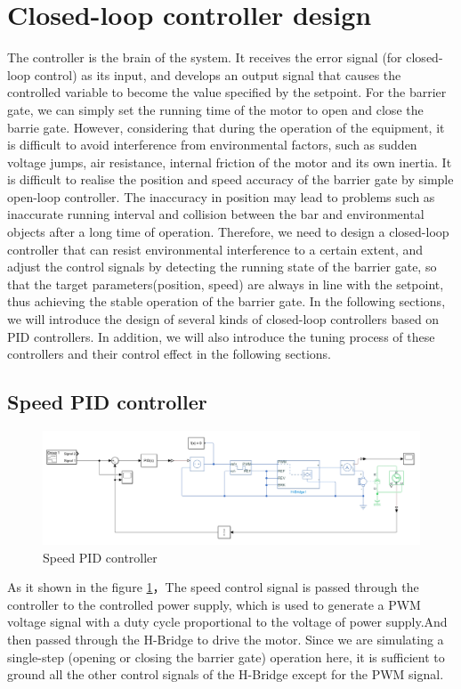 \documentclass[11pt,a4paper]{article}%
\begin{document}
\section{Closed-loop controller design}
The controller is the brain of the system. It receives the error signal (for closed-loop control) as its input, and develops an output signal that causes the controlled variable to become the value specified by the setpoint. For the barrier gate, we can simply set the running time of the motor to open and close the barrie gate.
However, considering that during the operation of the equipment, it is difficult to avoid interference from environmental factors, such as sudden voltage jumps, air resistance, internal friction of the motor and its own inertia. It is difficult to realise the position and speed accuracy of the barrier gate by simple open-loop controller. The inaccuracy in position may lead to problems such as inaccurate running interval and collision between the bar and environmental objects after a long time of operation.
Therefore, we need to design a closed-loop controller that can resist environmental interference to a certain extent, and adjust the control signals by detecting the running state of the barrier gate, so that the target parameters(position, speed) are always in line with the setpoint, thus achieving the stable operation of the barrier gate. In the following sections, we will introduce the design of several kinds of closed-loop controllers based on PID controllers.
In addition, we will also introduce the tuning process of these controllers and their control effect in the following sections.

\subsection{Speed PID controller}
\begin{figure}[H]
    \centering
    \includegraphics[width=1\textwidth]{controller1}
    \caption{Speed PID controller}
    \label{controller1}
\end{figure}
As it shown in the figure \ref{controller1}，The speed control signal is passed through the controller to the controlled power supply, which is used to generate a PWM voltage signal with a duty cycle proportional to the voltage of power supply.And then passed through the H-Bridge to drive the motor.
Since we are simulating a single-step (opening or closing the barrier gate) operation here, it is sufficient to ground all the other control signals of the H-Bridge except for the PWM signal.
\end{document}
